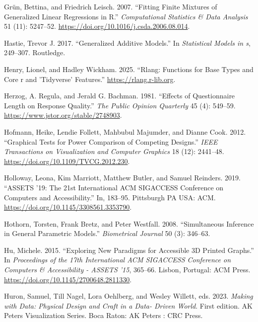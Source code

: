 \documentclass[
  letterpaper,
  DIV=11,
  numbers=noendperiod]{scrartcl}
\newlength{\cslhangindent}
\newenvironment{CSLReferences}[2] %
 {\begin{list}{}{%
  \setlength{\itemindent}{0pt}
  \setlength{\leftmargin}{0pt}
  \setlength{\parsep}{0pt}
  \ifodd #1
   \setlength{\leftmargin}{\cslhangindent}
   \setlength{\itemindent}{-1\cslhangindent}
  \fi
  \setlength{\itemsep}{#2\baselineskip}}}
 {\end{list}}
\begin{document}
\begin{CSLReferences}{1}{0}
Grün, Bettina, and Friedrich Leisch. 2007. {``Fitting Finite Mixtures of
Generalized Linear Regressions in {R}.''} \emph{Computational Statistics
\& Data Analysis} 51 (11): 5247--52.
\url{https://doi.org/10.1016/j.csda.2006.08.014}.

Hastie, Trevor J. 2017. {``Generalized Additive Models.''} In
\emph{Statistical Models in s}, 249--307. Routledge.

Henry, Lionel, and Hadley Wickham. 2025. {``Rlang: Functions for Base
Types and Core r and 'Tidyverse' Features.''}
\url{https://rlang.r-lib.org}.

Herzog, A. Regula, and Jerald G. Bachman. 1981. {``Effects of
Questionnaire Length on Response Quality.''} \emph{The Public Opinion
Quarterly} 45 (4): 549--59. \url{https://www.jstor.org/stable/2748903}.

Hofmann, Heike, Lendie Follett, Mahbubul Majumder, and Dianne Cook.
2012. {``Graphical Tests for Power Comparison of Competing Designs.''}
\emph{IEEE Transactions on Visualization and Computer Graphics} 18 (12):
2441--48. \url{https://doi.org/10.1109/TVCG.2012.230}.

Holloway, Leona, Kim Marriott, Matthew Butler, and Samuel Reinders.
2019. {``ASSETS '19: The 21st International ACM SIGACCESS Conference on
Computers and Accessibility.''} In, 183--95. Pittsburgh PA USA: ACM.
\url{https://doi.org/10.1145/3308561.3353790}.

Hothorn, Torsten, Frank Bretz, and Peter Westfall. 2008. {``Simultaneous
Inference in General Parametric Models.''} \emph{Biometrical Journal} 50
(3): 346--63.

Hu, Michele. 2015. {``Exploring {New Paradigms} for {Accessible 3D
Printed Graphs}.''} In \emph{Proceedings of the 17th {International ACM
SIGACCESS Conference} on {Computers} \& {Accessibility} - {ASSETS} '15},
365--66. Lisbon, Portugal: ACM Press.
\url{https://doi.org/10.1145/2700648.2811330}.

Huron, Samuel, Till Nagel, Lora Oehlberg, and Wesley Willett, eds. 2023.
\emph{Making with Data: Physical Design and Craft in a Data- Driven
World}. First edition. {AK Peters} Visualization Series. Boca Raton: AK
Peters : CRC Press.


\end{CSLReferences}
\end{document}
